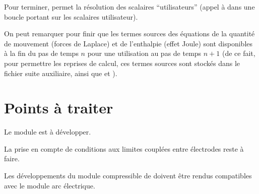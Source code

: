 Pour terminer,  permet la résolution des scalaires
``utilisateurs'' (appel à  dans une boucle portant sur les
 scalaires utilisateur).

On peut remarquer pour finir que les termes sources des équations de la quantité de
mouvement (forces de Laplace) et de l'enthalpie (effet Joule) sont disponibles
à la fin du pas de temps $n$ pour une utilisation au pas de temps $n+1$ (de ce
fait, pour permettre les reprises de calcul, ces termes sources sont stockés dans le fichier suite auxiliaire, ainsi que 
et ).

\newpage
\section*{Points à traiter}

 Le module est à développer.

 La prise en compte de conditions aux
limites couplées entre électrodes reste  à faire.

 Les  développements du module
compressible de \CS doivent être rendus compatibles avec le module arc électrique.
